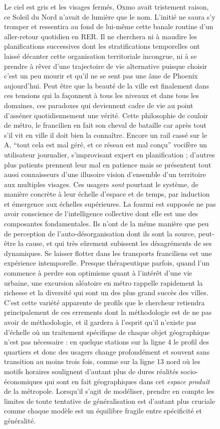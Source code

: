 \begin{figure}[h!]
\begin{mdframed}
Le ciel est gris et les visages fermés, Oxmo  avait tristement raison, ce Soleil du Nord n'avait de lumière que le nom. L'initié ne saura s'y tromper et ressentira au fond de lui-même cette banale routine d'un aller-retour quotidien en RER. Il ne cherchera ni à maudire les planifications successives dont les stratifications temporelles ont laissé décanter cette organisation territoriale incongrue, ni à se prendre à rêver d'une trajectoire de vie alternative puisque choisir c'est un peu mourir et qu'il ne se sent pas une âme de Phoenix aujourd'hui. Peut être que la beauté de la ville est finalement dans ces tensions qui la façonnent à tous les niveaux et dans tous les domaines, ces paradoxes qui deviennent cadre de vie au point d'asséner quotidiennement une vérité. Cette philosophie de couloir de métro, le francilien en fait son cheval de bataille car après tout s'il vit en ville il doit bien la connaître. Encore un rail cassé sur le A, ``tout cela est mal géré, et ce réseau est mal conçu'' vocifère un utilisateur journalier, s'improvisant expert en planification ; d'autres plus patients prennent leur mal en patience mais se présentent tout aussi connaisseurs d'une illusoire vision d'ensemble d'un territoire aux multiples visages. Ces usagers \emph{sont} pourtant le système, de manière concrète à leur échelle d'espace et de temps, par induction et émergence aux échelles supérieures. La fourmi est supposée ne pas avoir conscience de l'intelligence collective dont elle est une des composantes fondamentales. Ils n'ont de la même manière que peu de perception de l'auto-désorganisation dont ils sont la source, peut-être la cause, et qui très sûrement subissent les désagréments de ses dynamiques. Se laisser flotter dans les transports franciliens est une expérience intemporelle. Presque thérapeutique parfois, quand l'un commence à perdre son optimisme quant à l'intérêt d'une vie urbaine, une excursion aléatoire en métro rappelle rapidement la richesse et la diversité qui sont un des plus grand succès des villes. C'est cette variété apparente de profils que le chercheur retiendra principalement de ces errements dont la méthodologie est de ne pas avoir de méthodologie, et il gardera à l'esprit qu'il n'existe pas d'échelle où un traitement spécifique de chaque objet géographique n'est pas nécessaire : en quelque stations sur la ligne 4 le profil des quartiers et donc des usagers change profondément et souvent sans transition au moins trois fois, comme sur la ligne 13 nord où les motifs horaires soulignent d'autant plus de dures réalités socio-économiques qui sont en fait géographiques dans cet \emph{espace produit} de la métropole. Lorsqu'il s'agit de modéliser, prendre en compte les limites de toute tentative de généralisation est d'autant plus cruciale comme chaque modèle est un équilibre fragile entre spécificité et généralité.


\end{mdframed}
\end{figure}
